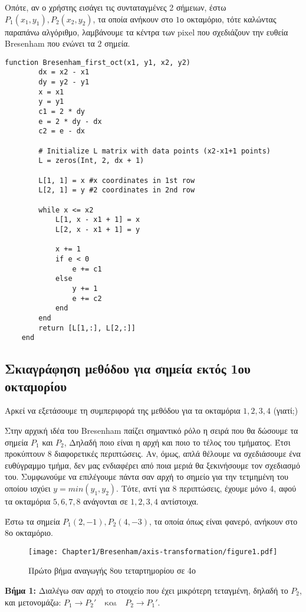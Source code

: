 Οπότε, αν ο χρήστης εισάγει τις συνταταγμένες 2 σήμειων, έστω $P_1(x_1,y_1), P_2(x_2,y_2)$, τα οποία ανήκουν στο $1$ο οκταμόριο, τότε καλώντας παραπάνω αλγόριθμο, λαμβάνουμε τα κέντρα των pixel που σχεδιάζουν την ευθεία Bresenham που ενώνει τα $2$ σημεία.

\begin{example}
\end{example}


\begin{lstlisting}[caption={Bresenham Line Algorithm for 1st Octant}]
	function Bresenham_first_oct(x1, y1, x2, y2) 
	    dx = x2 - x1
	    dy = y2 - y1
	    x = x1
	    y = y1
	    c1 = 2 * dy
	    e = 2 * dy - dx
	    c2 = e - dx
	    
	    # Initialize L matrix with data points (x2-x1+1 points)
	    L = zeros(Int, 2, dx + 1)
	    
	    L[1, 1] = x #x coordinates in 1st row
	    L[2, 1] = y #2 coordinates in 2nd row
	
	    while x <= x2
	        L[1, x - x1 + 1] = x
	        L[2, x - x1 + 1] = y
	        
	        x += 1
	        if e < 0
	            e += c1
	        else
	            y += 1
	            e += c2
	        end
	    end
	    return [L[1,:], L[2,:]]
	end
\end{lstlisting}

\subsection{Σκιαγράφηση μεθόδου για σημεία εκτός 1ου οκταμορίου}

Αρκεί να εξετάσουμε τη συμπεριφορά της μεθόδου για τα οκταμόρια $1, 2, 3, 4$ (γιατί;)
 
Στην αρχική ιδέα του Bresenham παίζει σημαντικό ρόλο η σειρά που θα δώσουμε τα σημεία $P_1$ και $P_2$, Δηλαδή ποιο είναι η αρχή και ποιο το τέλος του τμήματος. Έτσι προκύπτουν 8 διαφορετικές περιπτώσεις. Αν, όμως, απλά θέλουμε να σχεδιάσουμε ένα ευθύγραμμο τμήμα, δεν μας ενδιαφέρει από ποια μεριά θα ξεκινήσουμε τον σχεδιασμό του. Συμφωνούμε να επιλέγουμε πάντα σαν αρχή το σημείο για την τετμημένη του οποίου ισχύει $y = min(y_1,y_2)$. Τότε, αντί για 8 περιπτώσεις, έχουμε μόνο 4, αφού τα οκταμόρια $5, 6, 7, 8$ ανάγονται σε $1, 2, 3, 4$ αντίστοιχα.

\begin{example}
	Έστω τα σημεία $P_1(2,-1), P_2(4,-3)$, τα οποία όπως είναι φανερό, ανήκουν στο $8$ο οκταμόριο.
\end{example}
%
%
\begin{figure}[h!]
  \begin{center}
	  \texttt{[image: Chapter1/Bresenham/axis-transformation/figure1.pdf]}
  \end{center}
  \caption{Πρώτο βήμα αναγωγής 8ου τεταρτημορίου σε 4ο}
\end{figure}
%
%
\textbf{Βήμα 1:} Διαλέγω σαν αρχή το στοιχείο που έχει μικρότερη τεταγμένη, δηλαδή το $P_2$, και μετονομάζω: $P_1 \to P_2'\quad \text{και} \quad P_2 \to P_1'$.
%
%

